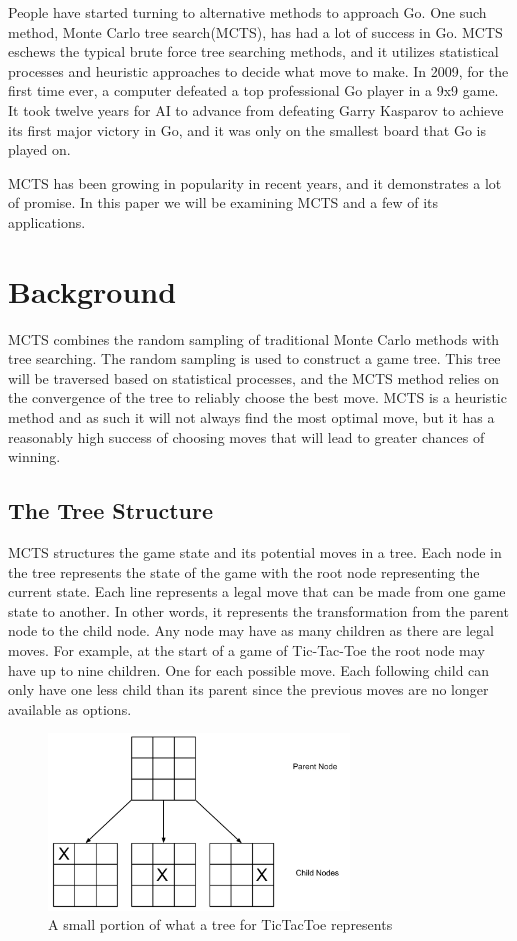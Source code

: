 \documentclass{sig-alternate}
\begin{document}
People have started turning to alternative methods to approach Go. One such method, Monte Carlo tree search(MCTS), has had a lot of success in Go. MCTS eschews the typical brute force tree searching methods, and it utilizes statistical processes and heuristic approaches to decide what move to make. In 2009, for the first time ever, a computer defeated a top professional Go player in a 9x9 game\cite{TheGrandChallenge}. It took twelve years for AI to advance from defeating Garry Kasparov to achieve its first major victory in Go, and it was only on the smallest board that Go is played on.

MCTS has been growing in popularity in recent years, and it demonstrates a lot of promise. In this paper we will be examining MCTS and a few of its applications.  
\section{Background}
MCTS combines the random sampling of traditional Monte Carlo methods with tree searching. The random sampling is used to construct a game tree. This tree will be traversed based on statistical processes, and the MCTS method relies on the convergence of the tree to reliably choose the best move. MCTS is a heuristic method and as such it will not always find the most optimal move, but it has a reasonably high success of choosing moves that will lead to greater chances of winning.
\subsection{The Tree Structure}
MCTS structures the game state and its potential moves in a tree. Each node in the tree represents the state of the game with the root node representing the current state. Each line represents a legal move that can be made from one game state to another. In other words, it represents the transformation from the parent node to the child node. Any node may have as many children as there are legal moves. For example, at the start of a game of Tic-Tac-Toe the root node may have up to nine children. One for each possible move. Each following child can only have one less child than its parent since the previous moves are no longer available as options.
\begin{figure}[h]
\includegraphics[width=8cm]{TicTacToeTree.pdf}
\centering
\caption{A small portion of what a tree for TicTacToe represents}
\label{fig:TicTacToe}
\end{figure}
\end{document}
